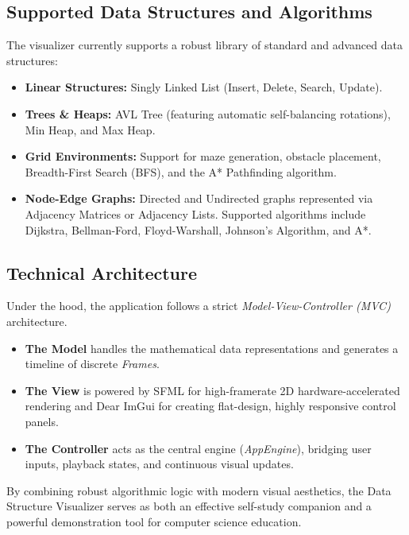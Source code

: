 \subsection{Supported Data Structures and Algorithms}
The visualizer currently supports a robust library of standard and advanced data structures:
\begin{itemize}[leftmargin=*]
    \item \textbf{Linear Structures:} Singly Linked List (Insert, Delete, Search, Update).
    \item \textbf{Trees \& Heaps:} AVL Tree (featuring automatic self-balancing rotations), Min Heap, and Max Heap.
    \item \textbf{Grid Environments:} Support for maze generation, obstacle placement, Breadth-First Search (BFS), and the A* Pathfinding algorithm.
    \item \textbf{Node-Edge Graphs:} Directed and Undirected graphs represented via Adjacency Matrices or Adjacency Lists. Supported algorithms include Dijkstra, Bellman-Ford, Floyd-Warshall, Johnson's Algorithm, and A*.
\end{itemize}

\subsection{Technical Architecture}
Under the hood, the application follows a strict \textit{Model-View-Controller (MVC)} architecture. 
\begin{itemize}
    \item \textbf{The Model} handles the mathematical data representations and generates a timeline of discrete \textit{Frames}.
    \item \textbf{The View} is powered by SFML for high-framerate 2D hardware-accelerated rendering and Dear ImGui for creating flat-design, highly responsive control panels. 
    \item \textbf{The Controller} acts as the central engine (\textit{AppEngine}), bridging user inputs, playback states, and continuous visual updates.
\end{itemize}

By combining robust algorithmic logic with modern visual aesthetics, the Data Structure Visualizer serves as both an effective self-study companion and a powerful demonstration tool for computer science education.
